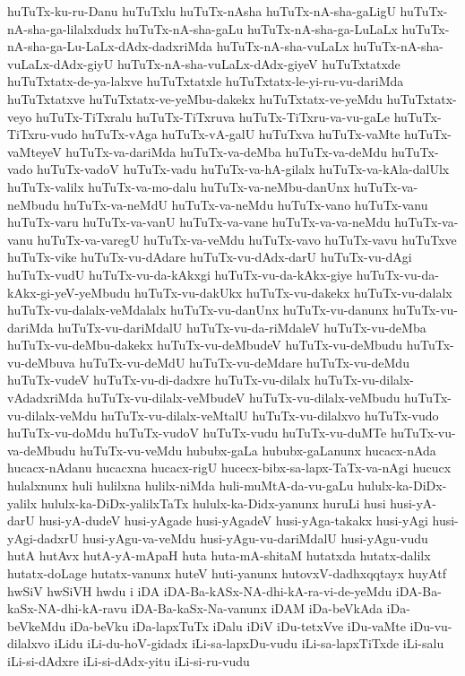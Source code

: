 {huTuTx-ku-ru-Danu
huTuTxlu
huTuTx-nAsha
huTuTx-nA-sha-gaLigU
huTuTx-nA-sha-ga-lilalxdudx
huTuTx-nA-sha-gaLu
huTuTx-nA-sha-ga-LuLaLx
huTuTx-nA-sha-ga-Lu-LaLx-dAdx-dadxriMda
huTuTx-nA-sha-vuLaLx
huTuTx-nA-sha-vuLaLx-dAdx-giyU
huTuTx-nA-sha-vuLaLx-dAdx-giyeV
huTuTxtatxde
huTuTxtatx-de-ya-lalxve
huTuTxtatxle
huTuTxtatx-le-yi-ru-vu-dariMda
huTuTxtatxve
huTuTxtatx-ve-yeMbu-dakekx
huTuTxtatx-ve-yeMdu
huTuTxtatx-veyo
huTuTx-TiTxralu
huTuTx-TiTxruva
huTuTx-TiTxru-va-vu-gaLe
huTuTx-TiTxru-vudo
huTuTx-vAga
huTuTx-vA-galU
huTuTxva
huTuTx-vaMte
huTuTx-vaMteyeV
huTuTx-va-dariMda
huTuTx-va-deMba
huTuTx-va-deMdu
huTuTx-vado
huTuTx-vadoV
huTuTx-vadu
huTuTx-va-hA-gilalx
huTuTx-va-kAla-dalUlx
huTuTx-valilx
huTuTx-va-mo-dalu
huTuTx-va-neMbu-danUnx
huTuTx-va-neMbudu
huTuTx-va-neMdU
huTuTx-va-neMdu
huTuTx-vano
huTuTx-vanu
huTuTx-varu
huTuTx-va-vanU
huTuTx-va-vane
huTuTx-va-va-neMdu
huTuTx-va-vanu
huTuTx-va-varegU
huTuTx-va-veMdu
huTuTx-vavo
huTuTx-vavu
huTuTxve
huTuTx-vike
huTuTx-vu-dAdare
huTuTx-vu-dAdx-darU
huTuTx-vu-dAgi
huTuTx-vudU
huTuTx-vu-da-kAkxgi
huTuTx-vu-da-kAkx-giye
huTuTx-vu-da-kAkx-gi-yeV-yeMbudu
huTuTx-vu-dakUkx
huTuTx-vu-dakekx
huTuTx-vu-dalalx
huTuTx-vu-dalalx-veMdalalx
huTuTx-vu-danUnx
huTuTx-vu-danunx
huTuTx-vu-dariMda
huTuTx-vu-dariMdalU
huTuTx-vu-da-riMdaleV
huTuTx-vu-deMba
huTuTx-vu-deMbu-dakekx
huTuTx-vu-deMbudeV
huTuTx-vu-deMbudu
huTuTx-vu-deMbuva
huTuTx-vu-deMdU
huTuTx-vu-deMdare
huTuTx-vu-deMdu
huTuTx-vudeV
huTuTx-vu-di-dadxre
huTuTx-vu-dilalx
huTuTx-vu-dilalx-vAdadxriMda
huTuTx-vu-dilalx-veMbudeV
huTuTx-vu-dilalx-veMbudu
huTuTx-vu-dilalx-veMdu
huTuTx-vu-dilalx-veMtalU
huTuTx-vu-dilalxvo
huTuTx-vudo
huTuTx-vu-doMdu
huTuTx-vudoV
huTuTx-vudu
huTuTx-vu-duMTe
huTuTx-vu-va-deMbudu
huTuTx-vu-veMdu
hububx-gaLa
hububx-gaLanunx
hucacx-nAda
hucacx-nAdanu
hucacxna
hucacx-rigU
hucecx-bibx-sa-lapx-TaTx-va-nAgi
hucucx
hulalxnunx
huli
hulilxna
hulilx-niMda
huli-muMtA-da-vu-gaLu
hululx-ka-DiDx-yalilx
hululx-ka-DiDx-yalilxTaTx
hululx-ka-Didx-yanunx
huruLi
husi
husi-yA-darU
husi-yA-dudeV
husi-yAgade
husi-yAgadeV
husi-yAga-takakx
husi-yAgi
husi-yAgi-dadxrU
husi-yAgu-va-veMdu
husi-yAgu-vu-dariMdalU
husi-yAgu-vudu
hutA
hutAvx
hutA-yA-mApaH
huta
huta-mA-shitaM
hutatxda
hutatx-dalilx
hutatx-doLage
hutatx-vanunx
huteV
huti-yanunx
hutovxV-dadhxqqtayx
huyAtf
hwSiV
hwSiVH
hwdu
i
iDA
iDA-Ba-kASx-NA-dhi-kA-ra-vi-de-yeMdu
iDA-Ba-kaSx-NA-dhi-kA-ravu
iDA-Ba-kaSx-Na-vanunx
iDAM
iDa-beVkAda
iDa-beVkeMdu
iDa-beVku
iDa-lapxTuTx
iDalu
iDiV
iDu-tetxVve
iDu-vaMte
iDu-vu-dilalxvo
iLidu
iLi-du-hoV-gidadx
iLi-sa-lapxDu-vudu
iLi-sa-lapxTiTxde
iLi-salu
iLi-si-dAdxre
iLi-si-dAdx-yitu
iLi-si-ru-vudu
}
